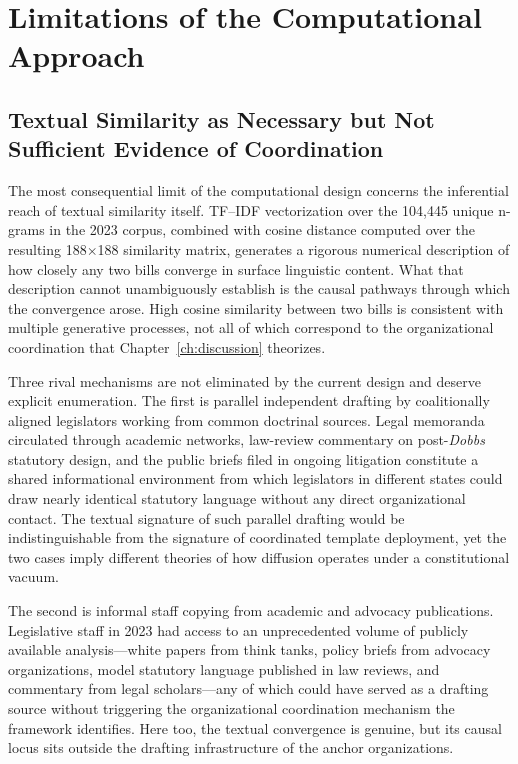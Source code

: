 \section{Limitations of the Computational Approach}
\label{sec:limits-computational}

\subsection{Textual Similarity as Necessary but Not Sufficient Evidence of Coordination}
\label{subsec:text-necessary}
The most consequential limit of the computational design concerns the inferential reach of textual similarity itself. TF--IDF vectorization over the 104{,}445 unique n-grams in the 2023 corpus, combined with cosine distance computed over the resulting 188$\times$188 similarity matrix, generates a rigorous numerical description of how closely any two bills converge in surface linguistic content. What that description cannot unambiguously establish is the causal pathways through which the convergence arose. High cosine similarity between two bills is consistent with multiple generative processes, not all of which correspond to the organizational coordination that Chapter~\ref{ch:discussion} theorizes.

Three rival mechanisms are not eliminated by the current design and deserve explicit enumeration. The first is parallel independent drafting by coalitionally aligned legislators working from common doctrinal sources. Legal memoranda circulated through academic networks, law-review commentary on post-\emph{Dobbs} statutory design, and the public briefs filed in ongoing litigation constitute a shared informational environment from which legislators in different states could draw nearly identical statutory language without any direct organizational contact. The textual signature of such parallel drafting would be indistinguishable from the signature of coordinated template deployment, yet the two cases imply different theories of how diffusion operates under a constitutional vacuum.

The second is informal staff copying from academic and advocacy publications. Legislative staff in 2023 had access to an unprecedented volume of publicly available analysis---white papers from think tanks, policy briefs from advocacy organizations, model statutory language published in law reviews, and commentary from legal scholars---any of which could have served as a drafting source without triggering the organizational coordination mechanism the framework identifies. Here too, the textual convergence is genuine, but its causal locus sits outside the drafting infrastructure of the anchor organizations.

